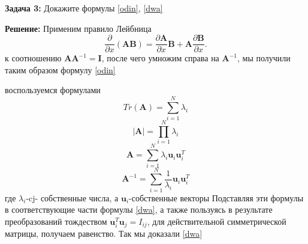 \textbf{Задача 3:}
Докажите формулы \ref{odin}, \ref{dwa} \

\textbf{Решение:}
Применим правило Лейбница
\[
\frac{\partial}{\partial x} (\mathbf{AB})=\frac{\partial \mathbf{A}}{\partial x}
 \mathbf{B}+\mathbf{A}\frac{\partial \mathbf{B}}{\partial x}.
\]
к соотношению $\mathbf{AA}^{-1}=\mathbf{I}$, после чего умножим справа на $\mathbf{A}^{-1}$, мы получили таким образом формулу \ref{odin}

воспользуемся формулами 
\[
Tr(\mathbf{A})=\displaystyle \sum_{i=1}^{N} \lambda_i
\]
\[
|\mathbf{A}|=\displaystyle \prod_{i=1}^{N} \lambda_i
\]
\[
\mathbf{A}=\displaystyle \sum_{i=1}^{N} \lambda_i \mathbf{u}_i\mathbf{u}_i^{T}
\]
\[
\mathbf{A}^{-1}=\displaystyle \sum_{i=1}^{N} \frac{1}{\lambda_i} \mathbf{u}_i\mathbf{u}_i^{T}
\]
где $\lambda_i$-cj- собственные числа, а $\mathbf{u}_i$-собственные векторы
Подставляя эти формулы в соответствующие части формулы \ref{dwa}, а также пользуясь в результате преобразований тождеством $\mathbf{u}_i^{T}\mathbf{u}_j=I_{ij}$, для действительной симметрической матрицы, получаем равенство. Так мы доказали \ref{dwa}
